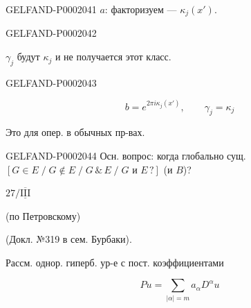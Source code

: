 \begin{GelfandAdjacentEvidence}{GELFAND-P000204}{1}
$a$: факторизуем --- $\kappa_j(x')$.
\end{GelfandAdjacentEvidence}
\begin{GelfandAdjacentEvidence}{GELFAND-P000204}{2}

$\gamma_j$ будут $\kappa_j$ и не получается этот класс.
\end{GelfandAdjacentEvidence}
\begin{GelfandAdjacentEvidence}{GELFAND-P000204}{3}

\begin{equation*}b=e^{2\pi i\kappa_j(x')},\qquad\gamma_j=\kappa_j\end{equation*}
\end{GelfandAdjacentEvidence}

Это для опер. в обычных пр-вах.



\begin{GelfandAdjacentEvidence}{GELFAND-P000204}{4}
Осн. вопрос: когда глобально сущ. $[G\in E\;/\;G\notin E\;/\;G\,\&\,E\;/\;G\text{ и }E\,?]$ (и $B$)?
\end{GelfandAdjacentEvidence}

$27/\overline{\underline{\mathrm{III}}}$\quad{}



(по Петровскому)



(Докл. №319 в сем. Бурбаки).



Рассм. однор. гиперб. ур-е с пост. коэффициентами



\begin{equation*}Pu=\sum_{|\alpha|=m}a_\alpha D^\alpha u\end{equation*}



